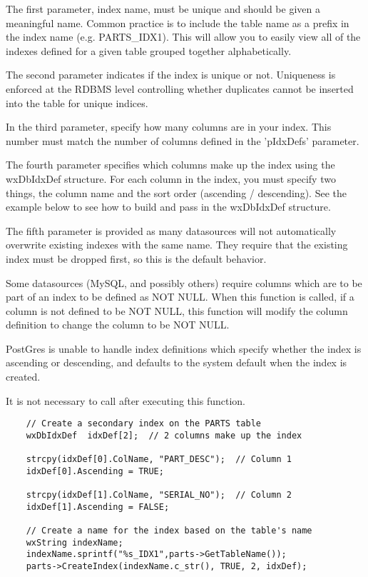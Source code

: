 
The first parameter, index name, must be unique and should be given a 
meaningful name.  Common practice is to include the table name as a prefix 
in the index name (e.g. PARTS_IDX1).  This will allow you to easily view all 
of the indexes defined for a given table grouped together alphabetically.

The second parameter indicates if the index is unique or not.  Uniqueness 
is enforced at the RDBMS level controlling whether duplicates cannot be 
inserted into the table for unique indices.

In the third parameter, specify how many columns are in your index.  This 
number must match the number of columns defined in the 'pIdxDefs' parameter.

The fourth parameter specifies which columns make up the index using the 
wxDbIdxDef structure.  For each column in the index, you must specify two 
things, the column name and the sort order (ascending / descending).  See 
the example below to see how to build and pass in the wxDbIdxDef structure.

The fifth parameter is provided as many datasources will not automatically 
overwrite existing indexes with the same name.  They require that the 
existing index must be dropped first, so this is the default behavior.

Some datasources (MySQL, and possibly others) require columns which are to be 
part of an index to be defined as NOT NULL.  When this function is called, if 
a column is not defined to be NOT NULL, this function will modify the column 
definition to change the column to be NOT NULL.

PostGres is unable to handle index definitions which specify whether the index 
is ascending or descending, and defaults to the system default when the index 
is created.

It is not necessary to call  
after executing this function.


\begin{verbatim}
    // Create a secondary index on the PARTS table
    wxDbIdxDef  idxDef[2];  // 2 columns make up the index

    strcpy(idxDef[0].ColName, "PART_DESC");  // Column 1
    idxDef[0].Ascending = TRUE;

    strcpy(idxDef[1].ColName, "SERIAL_NO");  // Column 2
    idxDef[1].Ascending = FALSE;

    // Create a name for the index based on the table's name
    wxString indexName;
    indexName.sprintf("%s_IDX1",parts->GetTableName());
    parts->CreateIndex(indexName.c_str(), TRUE, 2, idxDef);
\end{verbatim}


